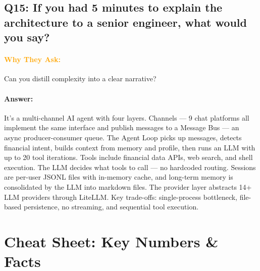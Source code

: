\documentclass[11pt,a4paper]{article}
\newcommand{\Q}[1]{\subsection{#1}}
\newcommand{\Ans}[1]{\paragraph{\textbf{Answer:}} #1}
\newcommand{\Why}{\paragraph{\textcolor{orange}{\textbf{Why They Ask:}}}}
\begin{document}
\Q{Q15: If you had 5 minutes to explain the architecture to a senior engineer, what would you say?}
\Why Can you distill complexity into a clear narrative?
\Ans It's a multi-channel AI agent with four layers. Channels --- 9 chat platforms all implement the same interface and publish messages to a Message Bus --- an async producer-consumer queue. The Agent Loop picks up messages, detects financial intent, builds context from memory and profile, then runs an LLM with up to 20 tool iterations. Tools include financial data APIs, web search, and shell execution. The LLM decides what tools to call --- no hardcoded routing. Sessions are per-user JSONL files with in-memory cache, and long-term memory is consolidated by the LLM into markdown files. The provider layer abstracts 14+ LLM providers through LiteLLM. Key trade-offs: single-process bottleneck, file-based persistence, no streaming, and sequential tool execution.

\newpage
\section{Cheat Sheet: Key Numbers \& Facts}
\end{document}
